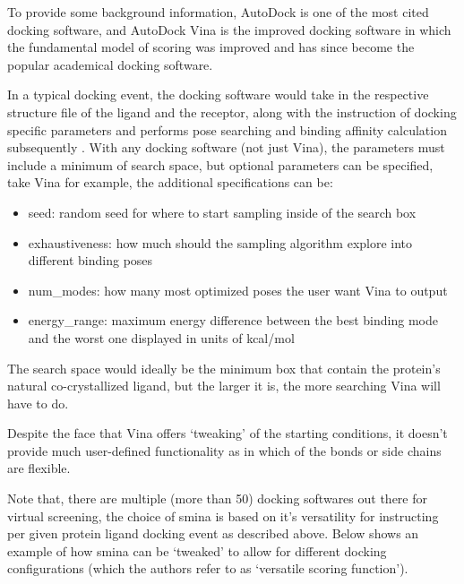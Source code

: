 To provide some background information, 
AutoDock \cite{autodock} is one of the most cited docking software, 
and AutoDock Vina  \cite{vina} is the improved docking software in which the fundamental model of scoring was improved and has since become the popular academical docking software.

In a typical docking event, the docking software would take in the respective structure file of the ligand and the receptor, along with the instruction of docking specific parameters and performs pose searching and binding affinity calculation subsequently \cite{Diederichs2016}. 
With any docking software (not just Vina), the parameters must include a minimum of search space, 
but optional parameters can be specified, take Vina for example, the additional specifications can be:
\begin{itemize}
	\item seed: random seed for where to start sampling inside of the search box
	\item exhaustiveness: how much should the sampling algorithm explore into different binding poses
	\item num\_modes: how many most optimized poses the user want Vina to output
	\item energy\_range: maximum energy difference between the best binding mode and the worst one displayed in units of kcal/mol
\end{itemize}
The search space would ideally be the minimum box that contain the protein's natural co-crystallized ligand, but the larger it is, the more searching Vina will have to do.

Despite the face that Vina offers `tweaking' of the starting conditions, 
it doesn't provide much user-defined functionality as in which of the bonds or side chains are flexible.


Note that, there are multiple (more than 50) docking softwares out there for virtual screening, 
the choice of smina is based on it's versatility for instructing per given protein ligand docking event as described above.
Below shows an example of how smina can be `tweaked' to allow for different docking configurations (which the authors refer to as `versatile scoring function').


